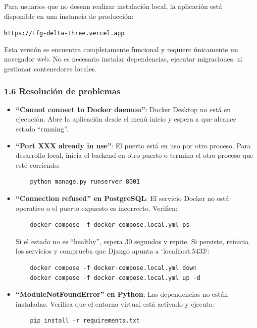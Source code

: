 Para usuarios que no desean realizar instalación local, la aplicación está disponible en una instancia de producción:

\begin{center}
\texttt{https://tfg-delta-three.vercel.app}
\end{center}

Esta versión se encuentra completamente funcional y requiere únicamente un navegador web.
 No es necesario instalar dependencias, ejecutar migraciones, ni gestionar contenedores locales.

 
\subsubsection*{1.6 Resolución de problemas}

\begin{itemize}
    \item \textbf{``Cannot connect to Docker daemon''}: Docker Desktop no está en ejecución. Abre la aplicación desde el menú inicio y espera a que alcance estado ``running''.
    
    \item \textbf{``Port XXX already in use''}: El puerto está en uso por otro proceso. Para desarrollo local, inicia el backend en otro puerto o termina el otro proceso que esté corriendo:
    \begin{verbatim}
    python manage.py runserver 8001
    \end{verbatim}
    
    \item \textbf{``Connection refused'' en PostgreSQL}: El servicio Docker no está operativo o el puerto expuesto es incorrecto. Verifica:
    \begin{verbatim}
    docker compose -f docker-compose.local.yml ps
    \end{verbatim}
    Si el estado no es ``healthy'', espera 30 segundos y repite. Si persiste, reinicia los servicios y comprueba que Django apunta a `localhost:5433`:
    \begin{verbatim}
    docker compose -f docker-compose.local.yml down
    docker compose -f docker-compose.local.yml up -d
    \end{verbatim}
    
    \item \textbf{``ModuleNotFoundError'' en Python}: Las dependencias no están instaladas. Verifica que el entorno virtual está activado y ejecuta:
    \begin{verbatim}
    pip install -r requirements.txt
    \end{verbatim}
    

\end{itemize}
